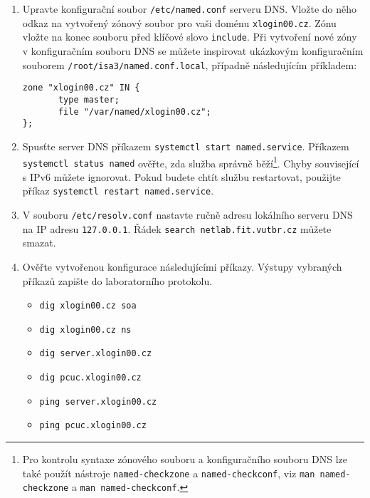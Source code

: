 \documentclass[a4paper,11pt]{article}
\begin{document}
\begin{enumerate}
\item Upravte konfigurační soubor {\tt /etc/named.conf} serveru DNS. Vložte do něho odkaz na vytvořený zónový soubor pro vaši doménu {\tt xlogin00.cz}. Zónu vložte na konec souboru před klíčové slovo {\tt include}. Při vytvoření nové zóny v konfiguračním souboru DNS se můžete inspirovat ukázkovým konfiguračním souborem {\tt /root/isa3/named.conf.local}, případně následujícím příkladem:
\begin{verbatim}
zone "xlogin00.cz" IN {
       type master;
       file "/var/named/xlogin00.cz";
};
\end{verbatim}
  \item Spusťte server DNS příkazem {\tt systemctl start named.service}. Příkazem {\tt systemctl status named} ověřte, zda služba správně běží\footnote{Pro kontrolu syntaxe zónového souboru a konfiguračního souboru DNS lze také použít nástroje {\tt named-checkzone} a {\tt named-checkconf}, viz {\tt man named-checkzone} a {\tt man named-checkconf}.}. Chyby související s IPv6 můžete ignorovat. Pokud budete chtít službu restartovat, použijte příkaz {\tt systemctl restart named.service}.

  \item V souboru {\tt /etc/resolv.conf} nastavte ručně adresu lokálního serveru DNS na IP adresu {\tt 127.0.0.1}. Řádek {\tt search netlab.fit.vutbr.cz} můžete smazat. 
  \item Ověřte vytvořenou konfigurace následujícími příkazy. Výstupy vybraných příkazů zapište do laboratorního protokolu. 
    \begin{itemize}
        \item {\tt dig xlogin00.cz soa}
        \item {\tt dig xlogin00.cz ns}
        \item {\tt dig server.xlogin00.cz}
        \item {\tt dig pcuc.xlogin00.cz}
        \item {\tt ping server.xlogin00.cz}
        \item {\tt ping pcuc.xlogin00.cz}
    \end{itemize}


\end{enumerate}
\end{document}
